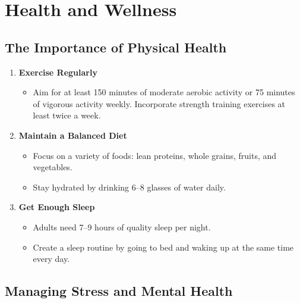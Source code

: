 \documentclass[
  letterpaper,
  DIV=11,
  numbers=noendperiod]{scrreprt}
\providecommand{\tightlist}{%
  \setlength{\itemsep}{0pt}\setlength{\parskip}{0pt}}\usepackage{longtable,booktabs,array}
\begin{document}

\chapter{Health and Wellness}\label{health-and-wellness}

\section{The Importance of Physical
Health}\label{the-importance-of-physical-health}

\begin{enumerate}
\def\labelenumi{\arabic{enumi}.}
\item
  \textbf{Exercise Regularly}

  \begin{itemize}
  \tightlist
  \item
    Aim for at least 150 minutes of moderate aerobic activity or 75
    minutes of vigorous activity weekly. Incorporate strength training
    exercises at least twice a week.
  \end{itemize}
\item
  \textbf{Maintain a Balanced Diet}

  \begin{itemize}
  \tightlist
  \item
    Focus on a variety of foods: lean proteins, whole grains, fruits,
    and vegetables.
  \item
    Stay hydrated by drinking 6--8 glasses of water daily.
  \end{itemize}
\item
  \textbf{Get Enough Sleep}

  \begin{itemize}
  \tightlist
  \item
    Adults need 7--9 hours of quality sleep per night.
  \item
    Create a sleep routine by going to bed and waking up at the same
    time every day.
  \end{itemize}
\end{enumerate}

\section{Managing Stress and Mental
Health}\label{managing-stress-and-mental-health}
\end{document}
